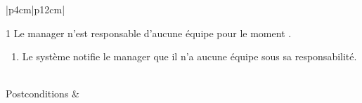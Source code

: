\begin{longtable}{|p{4cm}|p{12cm}|}
\begin{minipage}[t]{\linewidth}
                            1 Le manager n'est responsable d'aucune équipe pour le moment .
                                \begin{enumerate}[ nosep,after=\strut, ]
                                \item Le système notifie le manager que il n'a aucune équipe sous sa responsabilité.  
                                \end{enumerate}
                            \end{minipage}
                        \\
                        
                        \hline
                        Postconditions &   \\
                        \hline
                    \caption{Description du cas d'utilisation « Consulter la liste de mes équipes »}\\
            \end{longtable}
        
